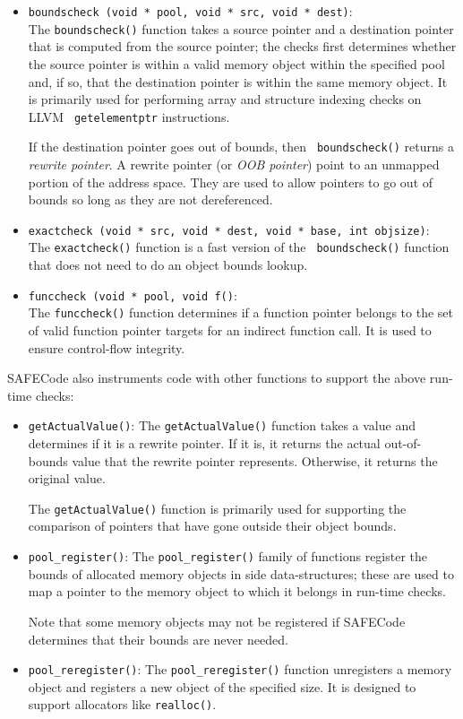 \begin{itemize}
\item{\tt boundscheck (void * pool, void * src, void * dest)}: \\
The {\tt boundscheck()} function takes a source pointer and a
destination pointer that is computed from the source pointer; the
checks first determines whether the source pointer is within a valid
memory object within the specified pool and, if so, that the
destination pointer is within the same memory object.  It is primarily
used for performing array and structure indexing checks on LLVM {\tt
getelementptr} instructions.

If the destination pointer goes out of bounds, then {\tt
boundscheck()} returns a \emph{rewrite pointer}.  A rewrite pointer
(or \emph{OOB pointer}) point to an unmapped portion of the address
space.  They are used to allow pointers to go out of bounds so long as
they are not dereferenced.

\item{\tt exactcheck (void * src, void * dest, void * base, int
objsize)}: \\
The {\tt exactcheck()} function is a fast version of the {\tt
boundscheck()} function that does not need to do an object bounds
lookup.

\item{\tt funccheck (void * pool, void f()}: \\
The {\tt funccheck()} function determines if a function pointer
belongs to the set of valid function pointer targets for an indirect
function call.  It is used to ensure control-flow integrity.
\end{itemize}

SAFECode also instruments code with other functions to support the
above run-time checks:

\begin{itemize}
\item{\tt getActualValue()}:
The {\tt getActualValue()} function takes a value and determines if it
is a rewrite pointer.  If it is, it returns the actual out-of-bounds
value that the rewrite pointer represents.  Otherwise, it returns the
original value.

The {\tt getActualValue()} function is primarily used for supporting
the comparison of pointers that have gone outside their object bounds.

\item{\tt pool\_register()}:
The {\tt pool\_register()} family of functions register the bounds of
allocated memory objects in side data-structures; these are used to
map a pointer to the memory object to which it belongs in run-time
checks.

Note that some memory objects may not be registered if SAFECode determines
that their bounds are never needed.

\item{\tt pool\_reregister()}:
The {\tt pool\_reregister()} function unregisters a memory object and
registers a new object of the specified size.  It is designed to
support allocators like {\tt realloc()}.
\end{itemize}
